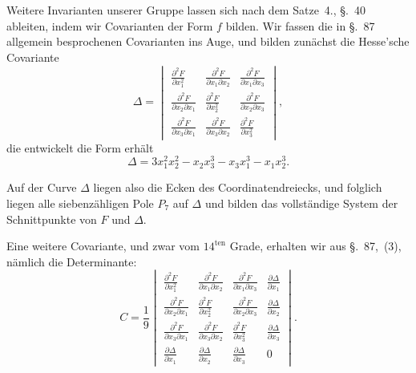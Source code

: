 \documentclass[12pt,a4paper]{article}
\begin{document}
Weitere Invarianten unserer Gruppe lassen sich nach dem Satze~4., \S.~40 ableiten, indem wir Covarianten der Form $f$ bilden. Wir fassen die in \S.~87 allgemein besprochenen Covarianten ins Auge, und bilden zun\"achst die Hesse'sche Covariante
\begin{equation}
\label{eq:hesse} \Delta = \begin{vmatrix} \tfrac{\partial^2 F}{\partial x_1^2} & \tfrac{\partial^2 F}{\partial x_1 \partial x_2} & \tfrac{\partial^2 F}{\partial x_1 \partial x_3} \\[0.5em] \tfrac{\partial^2 F}{\partial x_2 \partial x_1} & \tfrac{\partial^2 F}{\partial x_2^2} & \tfrac{\partial^2 F}{\partial x_2 \partial x_3} \\[0.5em] \tfrac{\partial^2 F}{\partial x_3 \partial x_1} & \tfrac{\partial^2 F}{\partial x_3 \partial x_2} & \tfrac{\partial^2 F}{\partial x_3^2} \end{vmatrix},
\end{equation}
die entwickelt die Form erh\"alt
\begin{equation}
\label{eq:deltaform} \Delta = 3x_1^2 x_2^2 - x_2 x_3^3 - x_3 x_1^3 - x_1 x_2^3.
\end{equation}

Auf der Curve $\Delta$ liegen also die Ecken des Coordinatendreiecks, und folglich liegen alle siebenz\"ahligen Pole $P_7$ auf $\Delta$ und bilden das vollst\"andige System der Schnittpunkte von $F$ und $\Delta$.

Eine weitere Covariante, und zwar vom $14^{\text{ten}}$ Grade, erhalten wir aus \S.~87,~(3), n\"amlich die Determinante:
\begin{equation}
\label{eq:C} C = \frac{1}{9} \begin{vmatrix} \tfrac{\partial^2 F}{\partial x_1^2} & \tfrac{\partial^2 F}{\partial x_1 \partial x_2} & \tfrac{\partial^2 F}{\partial x_1 \partial x_3} & \tfrac{\partial \Delta}{\partial x_1} \\[0.5em] \tfrac{\partial^2 F}{\partial x_2 \partial x_1} & \tfrac{\partial^2 F}{\partial x_2^2} & \tfrac{\partial^2 F}{\partial x_2 \partial x_3} & \tfrac{\partial \Delta}{\partial x_2} \\[0.5em] \tfrac{\partial^2 F}{\partial x_3 \partial x_1} & \tfrac{\partial^2 F}{\partial x_3 \partial x_2} & \tfrac{\partial^2 F}{\partial x_3^2} & \tfrac{\partial \Delta}{\partial x_3} \\[0.5em] \tfrac{\partial \Delta}{\partial x_1} & \tfrac{\partial \Delta}{\partial x_2} & \tfrac{\partial \Delta}{\partial x_3} & 0 \end{vmatrix}.
\end{equation}
\end{document}
